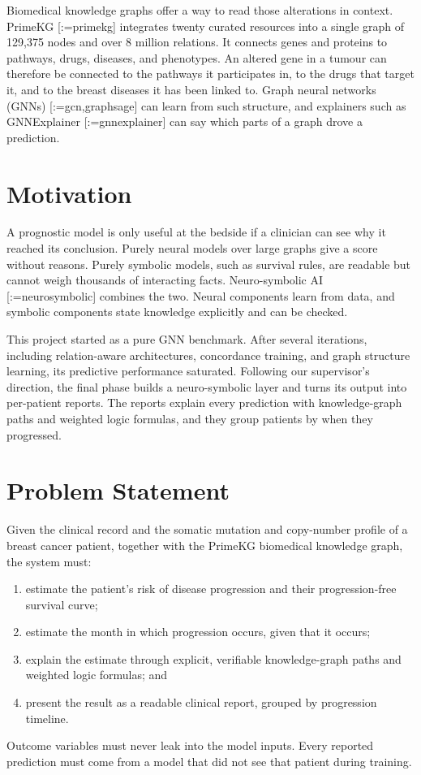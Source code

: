 \documentclass{mnnit}
\makeatletter
\newcommand{\rc}[1]{[\def\rc@sep{}\@for\rc@key:=#1\do{\rc@sep\ref{ref:\rc@key}\def\rc@sep{, }}]}
\makeatother
\begin{document}
Biomedical knowledge graphs offer a way to read those alterations in context. PrimeKG \rc{primekg} integrates
twenty curated resources into a single graph of 129,375 nodes and over 8 million relations. It connects genes and
proteins to pathways, drugs, diseases, and phenotypes. An altered gene in a tumour can therefore be connected to the
pathways it participates in, to the drugs that target it, and to the breast diseases it has been linked to. Graph
neural networks (GNNs) \rc{gcn,graphsage} can learn from such structure, and explainers such as GNNExplainer
\rc{gnnexplainer} can say which parts of a graph drove a prediction.

\section{Motivation}
A prognostic model is only useful at the bedside if a clinician can see why it reached its conclusion.
Purely neural models over large graphs give a score without reasons. Purely symbolic models, such as survival
rules, are readable but cannot weigh thousands of interacting facts. Neuro-symbolic AI \rc{neurosymbolic} combines
the two. Neural components learn from data, and symbolic components state knowledge explicitly and can be checked.

This project started as a pure GNN benchmark. After several iterations, including relation-aware architectures,
concordance training, and graph structure learning, its predictive performance saturated. Following our
supervisor's direction, the final phase builds a neuro-symbolic layer and turns its output into per-patient
reports. The reports explain every prediction with knowledge-graph paths and weighted logic formulas, and they group
patients by when they progressed.

\section{Problem Statement}
Given the clinical record and the somatic mutation and copy-number profile of a breast cancer patient, together
with the PrimeKG biomedical knowledge graph, the system must:
\begin{enumerate}
  \item estimate the patient's risk of disease progression and their progression-free survival curve;
  \item estimate the month in which progression occurs, given that it occurs;
  \item explain the estimate through explicit, verifiable knowledge-graph paths and weighted logic formulas; and
  \item present the result as a readable clinical report, grouped by progression timeline.
\end{enumerate}
Outcome variables must never leak into the model inputs. Every reported prediction must come from a model that
did not see that patient during training.
\end{document}
